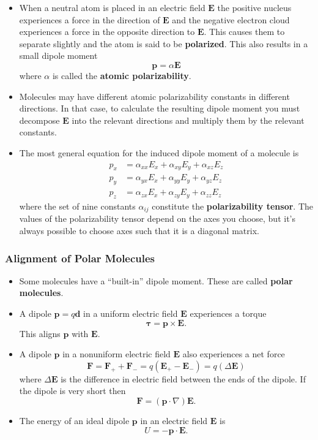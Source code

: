 \documentclass{article}
\renewcommand{\vec}[1]{\boldsymbol{\mathbf{#1}}}
\begin{document}
\begin{itemize}
  \item When a neutral atom is placed in an electric field $\vec{E}$ the positive nucleus experiences a force in the direction of $\vec{E}$ and the negative electron cloud experiences a force in the opposite direction to $\vec{E}$. This causes them to separate slightly and the atom is said to be \textbf{polarized}. This also results in a small dipole moment \[\vec{p} = \alpha \vec{E}\] where $\alpha$ is called the \textbf{atomic polarizability}.

  \item Molecules may have different atomic polarizability constants in different directions. In that case, to calculate the resulting dipole moment you must decompose $\vec{E}$ into the relevant directions and multiply them by the relevant constants.

  \item The most general equation for the induced dipole moment of a molecule is \begin{align*}
          p_x & = \alpha_{x x} E_x + \alpha_{x y} E_y + \alpha_{x z} E_z \\
          p_y & = \alpha_{y x} E_x + \alpha_{y y} E_y + \alpha_{y z} E_z \\
          p_z & = \alpha_{z x} E_x + \alpha_{z y} E_y + \alpha_{z z} E_z
        \end{align*} where the set of nine constants $\alpha_{i j}$ constitute the \textbf{polarizability tensor}. The values of the polarizability tensor depend on the axes you choose, but it's always possible to choose axes such that it is a diagonal matrix.
\end{itemize}

\subsubsection{Alignment of Polar Molecules}

\begin{itemize}
  \item Some molecules have a ``built-in'' dipole moment. These are called \textbf{polar molecules}.

  \item A dipole $\vec{p} = q \vec{d}$ in a uniform electric field $\vec{E}$ experiences a torque \[\vec{\tau} = \vec{p} \times \vec{E}.\] This aligns $\vec{p}$ with $\vec{E}$.

  \item A dipole $\vec{p}$ in a nonuniform electric field $\vec{E}$ also experiences a net force \[\vec{F} = \vec{F}_+ + \vec{F}_- = q (\vec{E}_+ - \vec{E}_-) = q (\Delta \vec{E})\] where $\Delta \vec{E}$ is the difference in electric field between the ends of the dipole. If the dipole is very short then \[\vec{F} = (\vec{p} \cdot \nabla) \vec{E}.\]

  \item The energy of an ideal dipole $\vec{p}$ in an electric field $\vec{E}$ is \[U = -\vec{p} \cdot \vec{E}.\]
\end{itemize}
\end{document}
